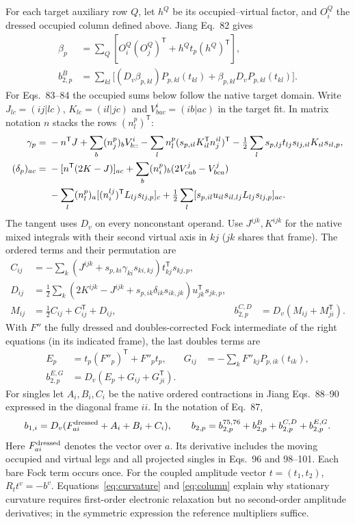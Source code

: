 \documentclass[11pt]{article}
\begin{document}
For each target auxiliary row $Q$, let $h^Q$ be its occupied--virtual factor,
and $O_i^Q$ the dressed occupied column defined above. Jiang Eq.~82 gives
\begin{align}
 \beta_{p}&=\sum_Q[O_i^Q(O_j^Q)^{\mathsf T}+h^Qt_p(h^Q)^{\mathsf T}],\\
 b_{2,p}^{B}&=\sum_{kl}\big[(D_v\beta_{p,kl})P_{p,kl}(t_{kl})
       +\beta_{p,kl}D_v P_{p,kl}(t_{kl})\big].
\end{align}
For Eqs.~83--84 the occupied sums below follow the native target domain.
Write $J_{lc}=(ij|lc)$, $K_{lc}=(il|jc)$ and $V^i_{bac}=(ib|ac)$ in
the target fit. In matrix notation $n$ stacks the rows $(n_l^p)^{\mathsf T}$:
\begin{align}
 \gamma_p={}&-n^{\mathsf T}J+\sum_b(n_j^p)_b V^i_{b::}
 -\sum_l n_l^p(s_{p,il}K_{il}^{\mathsf T}n_j^{il})^{\mathsf T}
 -\tfrac12\sum_l s_{p,lj}t_{lj}s_{lj,il}K_{il}s_{il,p},\\
 (\delta_p)_{ac}={}&-[n^{\mathsf T}(2K-J)]_{ac}
 +\sum_b(n_i^p)_b(2V^j_{cab}-V^j_{bca})\notag\\
 &-\sum_l (n_l^p)_a[(n_i^{lj})^{\mathsf T}L_{lj}s_{lj,p}]_c
 +\tfrac12\sum_l[s_{p,il}u_{il}s_{il,lj}L_{lj}s_{lj,p}]_{ac}.
\end{align}
The tangent uses $D_v$ on every nonconstant operand. Use $J^{ijk},K^{ijk}$
for the native mixed integrals with their second virtual axis in $kj$
($jk$ shares that frame). The ordered terms and their permutation are
\begin{align}
 C_{ij}&=-\sum_k(J^{ijk}+s_{p,ki}\gamma_{ki}s_{ki,kj})t_{kj}^{\mathsf T}s_{kj,p},\\
 D_{ij}&=\tfrac12\sum_k(2K^{ijk}-J^{ijk}+s_{p,ik}\delta_{ik}s_{ik,jk})
                 u_{jk}^{\mathsf T}s_{jk,p},\\
 M_{ij}&=\tfrac12 C_{ij}+C_{ij}^{\mathsf T}+D_{ij},&
 b_{2,p}^{C,D}&=D_v(M_{ij}+M_{ji}^{\mathsf T}).
\end{align}
With $F''$ the fully dressed and doubles-corrected Fock intermediate of the
right equations (in its indicated frame), the last doubles terms are
\begin{align}
 E_p &=t_p(F''_p)^{\mathsf T}+F''_pt_p,&
 G_{ij}&=-\sum_k F''_{kj}P_{p,ik}(t_{ik}),\\
 b_{2,p}^{E,G}&=D_v(E_p+G_{ij}+G_{ji}^{\mathsf T}).
\end{align}
For singles let $A_i,B_i,C_i$ be the native ordered contractions in Jiang
Eqs.~88--90 expressed in the diagonal frame $ii$. In the notation of Eq.~87,
\begin{equation}
 b_{1,i}=D_v(F^{\rm dressed}_{ai}+A_i+B_i+C_i),\qquad
 b_{2,p}=b_{2,p}^{75,76}+b_{2,p}^{B}+b_{2,p}^{C,D}+b_{2,p}^{E,G}.
\end{equation}
Here $F^{\rm dressed}_{ai}$ denotes the vector over $a$. Its derivative
includes the moving occupied and virtual legs and all projected singles in
Eqs.~96 and 98--101. Each bare Fock term occurs once.
For the coupled amplitude vector $t=(t_1,t_2)$, $R_t t^v=-b^v$.
Equations~\eqref{eq:curvature} and \eqref{eq:column} explain why stationary
curvature requires first-order electronic relaxation but no second-order
amplitude derivatives; in the symmetric expression the reference multipliers
suffice.
\end{document}
